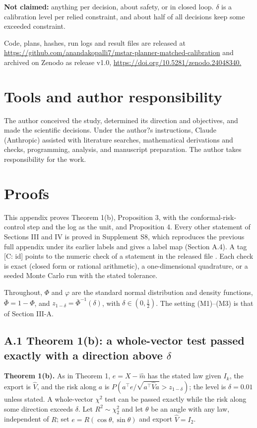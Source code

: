 \documentclass{ieeeaccess}
\begin{document}
\textbf{Not claimed:} anything per decision, about safety, or in closed loop. $\delta$ is a calibration level per relied constraint, and about half of all decisions keep some exceeded constraint.

Code, plans, hashes, run logs and result files are released at \url{https://github.com/anandakopalli7/mstar-planner-matched-calibration} and archived on Zenodo as release v1.0, \url{https://doi.org/10.5281/zenodo.24048340.}

\section*{Tools and author responsibility}
The author conceived the study, determined its direction and objectives, and made the scientific decisions. Under the author$\text{?}$s instructions, Claude (Anthropic) assisted with literature searches, mathematical derivations and checks, programming, analysis, and manuscript preparation. The author takes responsibility for the work.

\appendices
\section{\break Proofs}
This appendix proves Theorem 1(b), Proposition 3, with the conformal-risk-control step and the log as the unit, and Proposition 4. Every other statement of Sections III and IV is proved in Supplement S8, which reproduces the previous full appendix under its earlier labels and gives a label map (Section A.4). A tag [C: id] points to the numeric check of a statement in the released file . Each check is exact (closed form or rational arithmetic), a one-dimensional quadrature, or a seeded Monte Carlo run with the stated tolerance.

Throughout, $\Phi$ and $\varphi$ are the standard normal distribution and density functions, $\bar{\Phi} = 1 - \Phi$, and $z_{1-\delta} = \bar{\Phi}^{-1}(\delta)$, with $\delta \in (0, \tfrac{1}{2})$. The setting (M1)--(M3) is that of Section III-A.

\subsection*{A.1 Theorem 1(b): a whole-vector test passed exactly with a direction above $\delta$}
\textbf{Theorem 1(b).} As in Theorem 1, $e = X - \hat{m}$ has the stated law given $I_{k}$, the export is $\hat{V}$, and the risk along $a$ is $P(a^{\top}e/\sqrt{a^{\top}\hat{V}a} > z_{1-\delta})$; the level is $\delta = 0.01$ unless stated. A whole-vector $\chi^{2}$ test can be passed exactly while the risk along some direction exceeds $\delta$. Let $R^{2} \sim \chi_{2}^{2}$ and let $\theta$ be an angle with any law, independent of $R$; set $e = R(\cos \theta, \sin \theta)$ and export $\hat{V} = I_{2}$.
\end{document}
